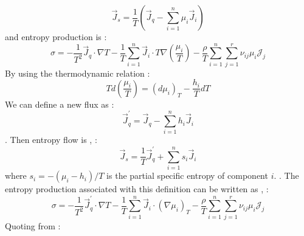 \begin{equation}
\vec{J}_s = \frac{1}{T} \left( \vec{J}_q - \sum_{i=1}^n \mu_i \vec{J}_i \right)
\end{equation}
and entropy production is \cite[Eq.~III.21,][]{DM62}:
\begin{equation}
\sigma = - \frac{1}{T^2} \vec{J}_q \cdot \nabla T - \frac{1}{T} \sum_{i=1}^n \vec{J}_i \cdot T \nabla \left( \frac{\mu_i}{T} \right)
- \frac{\rho}{T} \sum_{i=1}^n \sum_{j=1}^r \nu_{ij} \mu_i \mathcal{J}_j
\end{equation}
By using the thermodynamic relation \cite[Eq.~III.23,][]{DM62}:
\begin{equation}
T d \left( \frac{\mu_i}{T} \right) = \left( d \mu_i \right)_T - \frac{h_i}{T} dT
\end{equation}
We can define a new flux as \cite[Eq.~III.24,][]{DM62}:
\begin{equation}
\vec{J}_q^\prime = \vec{J}_q - \sum_{i=1}^n h_i \vec{J}_i
\label{eq:Jqprime}
\end{equation}
.
Then entropy flow is \cite[Eq.~III.26,][]{DM62}, \cite[also Eq.~A5,][]{ABE95}:
\begin{equation}
\vec{J}_s = \frac{1}{T} \vec{J}_q^\prime + \sum_{i=1}^n s_i \vec{J}_i
\label{DM62_ch3_eq26}
\end{equation}
where $s_i = -(\mu_i-h_i)/T$ is the partial specific entropy of component $i$.  .  The entropy production associated with this definition can be written as \cite[Eq.~III.25,][]{DM62}, \cite[also Eq.~A6,][]{ABE95}:
\begin{equation}
\sigma = - \frac{1}{T^2} \vec{J}_q^\prime \cdot \nabla T - \frac{1}{T} \sum_{i=1}^n \vec{J}_i \cdot \left( \nabla \mu_i \right)_T - \frac{\rho}{T} \sum_{i=1}^n \sum_{j=1}^r \nu_{ij} \mu_i \mathcal{J}_j
\label{eq:DM62_ch3_eq25}
\end{equation}
Quoting from \cite{DM62}:\\

